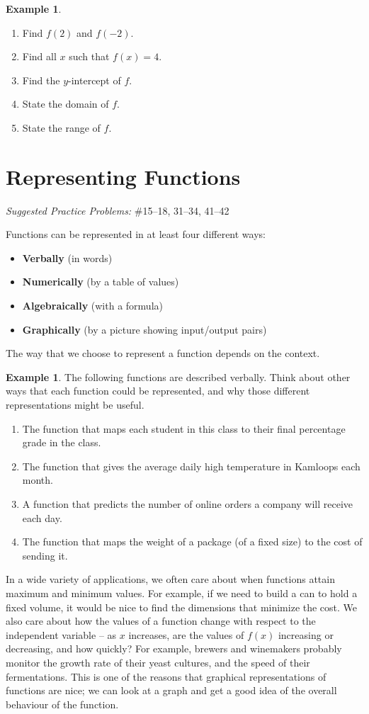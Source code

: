 \documentclass[letterpaper,12pt,oneside]{book}
\theoremstyle{definition}
\newtheorem{example}[theorem]{Example}
\newcommand{\practicesection}[2]{%
    \section{#1}
    \textit{Suggested Practice Problems:} #2
    \smallskip%
}
\begin{document}
{\begin{example}
\begin{multicols}{2}
\begin{enumerate}
\item Find $f(2)$ and $f(-2)$.
\vfill
\item Find all $x$ such that $f(x)=4$.
\vfill
\item Find the $y$-intercept of $f$.
\vfill
\item State the domain of $f$.
\vfill
\item State the range of $f$.
\vspace*{\fill}
\end{enumerate}
\end{multicols}
\end{example}

\newpage

\practicesection{Representing Functions}{\#15--18, 31--34, 41--42}

\noindent
Functions can be represented in at least four different ways:
\begin{itemize}
\item \textbf{Verbally} (in words)
\item \textbf{Numerically} (by a table of values)
\item \textbf{Algebraically} (with a formula)
\item \textbf{Graphically} (by a picture showing input/output pairs)
\end{itemize}
The way that we choose to represent a function depends on the context.

\begin{example}
The following functions are described verbally.  Think about other ways that each function could be represented, and why those different representations might be useful.
\begin{enumerate}
\item The function that maps each student in this class to their final percentage grade in the class.
\vfill
\item The function that gives the average daily high temperature in Kamloops each month.
\vfill
\item A function that predicts the number of online orders a company will receive each day.
\vfill
\item The function that maps the weight of a package (of a fixed size) to the cost of sending it.
\vfill
\end{enumerate} 
\end{example}

In a wide variety of applications, we often care about when functions attain maximum and minimum values.  For example, if we need to build a can to hold a fixed volume, it would be nice to find the dimensions that minimize the cost.  We also care about how the values of a function change with respect to the independent variable -- as $x$ increases, are the values of $f(x)$ increasing or decreasing, and how quickly?  For example, brewers and winemakers probably monitor the growth rate of their yeast cultures, and the speed of their fermentations.  This is one of the reasons that graphical representations of functions are nice; we can look at a graph and get a good idea of the overall behaviour of the function.

}
\end{document}
